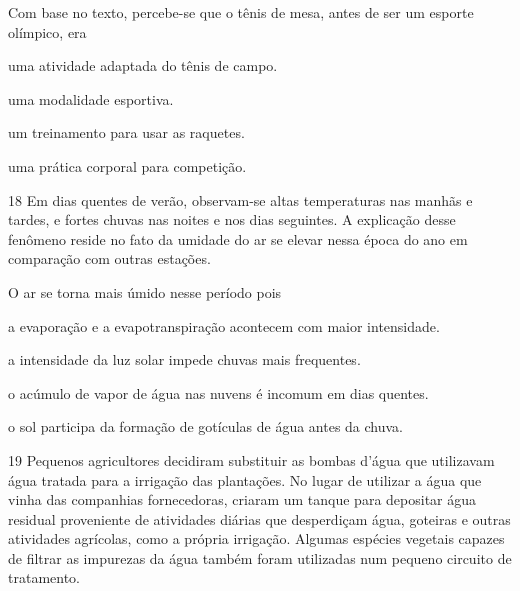 \noindent{}Com base no texto, percebe-se que o tênis de mesa, antes de ser um esporte olímpico, era

\begin{escolha}
\item uma atividade adaptada do tênis de campo.

\item uma modalidade esportiva.

\item um treinamento para usar as raquetes.

\item uma prática corporal para competição.
\end{escolha}


\pagebreak
\num{18} Em dias quentes de verão, observam-se altas temperaturas
nas manhãs e tardes, e fortes chuvas nas noites e nos dias seguintes. A
explicação desse fenômeno reside no fato da umidade do ar se elevar
nessa época do ano em comparação com outras estações.

O ar se torna mais úmido nesse período pois

\begin{escolha}
\item a evaporação e a evapotranspiração acontecem com maior intensidade.

\item a intensidade da luz solar impede chuvas mais frequentes.

\item o acúmulo de vapor de água nas nuvens é incomum em dias quentes.

\item o sol participa da formação de gotículas de água antes da chuva.
\end{escolha}


\num{19} Pequenos agricultores decidiram substituir as bombas d'água
que utilizavam água tratada para a irrigação das plantações. No lugar de
utilizar a água que vinha das companhias fornecedoras, criaram um tanque
para depositar água residual proveniente de atividades diárias que
desperdiçam água, goteiras e outras atividades agrícolas, como a própria
irrigação. Algumas espécies vegetais capazes de filtrar as impurezas da
água também foram utilizadas num pequeno circuito de tratamento.

